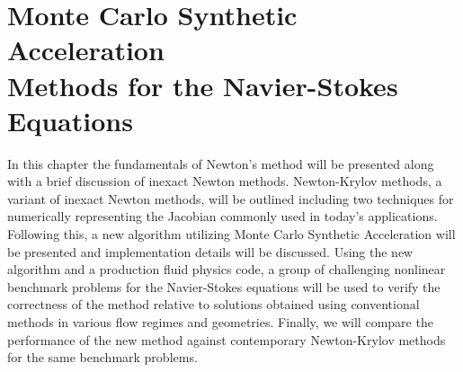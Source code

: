 \chapter{Monte Carlo Synthetic Acceleration\\ Methods for the
  Navier-Stokes\\ Equations\ }
\label{ch:nonlinear_problem}

In this chapter the fundamentals of Newton's method will be presented
along with a brief discussion of inexact Newton methods. Newton-Krylov
methods, a variant of inexact Newton methods, will be outlined
including two techniques for numerically representing the Jacobian
commonly used in today's applications. Following this, a new algorithm
utilizing Monte Carlo Synthetic Acceleration will be presented and
implementation details will be discussed. Using the new algorithm and
a production fluid physics code, a group of challenging nonlinear
benchmark problems for the Navier-Stokes equations will be used to
verify the correctness of the method relative to solutions obtained
using conventional methods in various flow regimes and
geometries. Finally, we will compare the performance of the new method
against contemporary Newton-Krylov methods for the same benchmark
problems.

